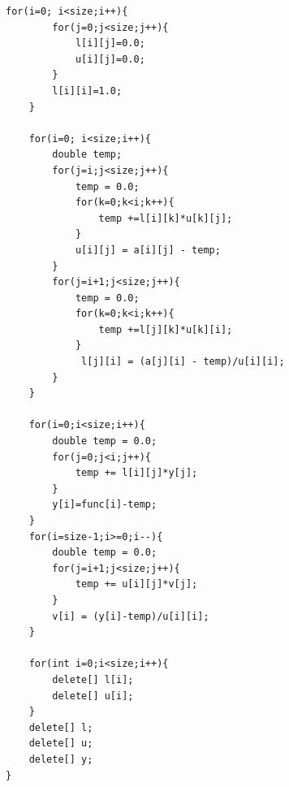 \documentclass[11pt,a4paper]{article}
\begin{document}
\begin{lstlisting}[title={LUdecomp.cpp}]
	for(i=0; i<size;i++){
		for(j=0;j<size;j++){
			l[i][j]=0.0;
			u[i][j]=0.0;
		}
		l[i][i]=1.0;
	}

	for(i=0; i<size;i++){
		double temp;
		for(j=i;j<size;j++){
			temp = 0.0;
			for(k=0;k<i;k++){
				temp +=l[i][k]*u[k][j];
			}
			u[i][j] = a[i][j] - temp;
		}
		for(j=i+1;j<size;j++){
			temp = 0.0;
			for(k=0;k<i;k++){
				temp +=l[j][k]*u[k][i];
			}
			 l[j][i] = (a[j][i] - temp)/u[i][i];
		}
	}

	for(i=0;i<size;i++){
		double temp = 0.0;
		for(j=0;j<i;j++){
			temp += l[i][j]*y[j];
		}
		y[i]=func[i]-temp;
	}
	for(i=size-1;i>=0;i--){
		double temp = 0.0;
		for(j=i+1;j<size;j++){
			temp += u[i][j]*v[j];
		}
		v[i] = (y[i]-temp)/u[i][i];
	}

	for(int i=0;i<size;i++){
		delete[] l[i];
		delete[] u[i];
	}
	delete[] l;
	delete[] u;
	delete[] y;
}
\end{lstlisting}
\end{document}

